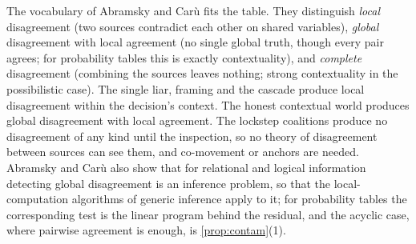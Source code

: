 \documentclass[11pt]{article}
\theoremstyle{definition}\newtheorem{definition}[theorem]{Definition}\newtheorem{remark}[theorem]{Remark}\newtheorem{example}[theorem]{Example}\newtheorem{problem}[theorem]{Open problem}\crefname{problem}{Problem}{Problems}
\begin{document}
The vocabulary of Abramsky and Car\`u \cite{AbramskyCaru2019} fits the table. They distinguish \emph{local} disagreement (two sources contradict each other on shared variables), \emph{global} disagreement with local agreement (no single global truth, though every pair agrees; for probability tables this is exactly contextuality), and \emph{complete} disagreement (combining the sources leaves nothing; strong contextuality in the possibilistic case). The single liar, framing and the cascade produce local disagreement within the decision's context. The honest contextual world produces global disagreement with local agreement. The lockstep coalitions produce no disagreement of any kind until the inspection, so no theory of disagreement between sources can see them, and co-movement or anchors are needed. Abramsky and Car\`u also show that for relational and logical information detecting global disagreement is an inference problem, so that the local-computation algorithms of generic inference apply to it; for probability tables the corresponding test is the linear program behind the residual, and the acyclic case, where pairwise agreement is enough, is \cref{prop:contam}(1).
\end{document}
